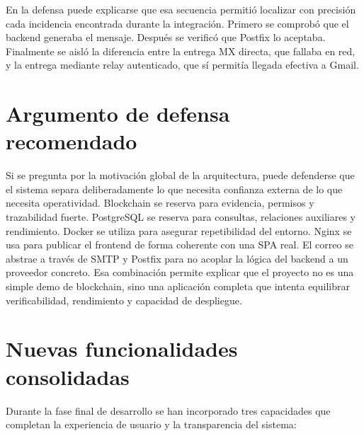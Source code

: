 \documentclass[11pt, a4paper]{article}
\begin{document}
En la defensa puede explicarse que esa secuencia permitió localizar con precisión cada incidencia encontrada durante la integración. Primero se comprobó que el backend generaba el mensaje. Después se verificó que Postfix lo aceptaba. Finalmente se aisló la diferencia entre la entrega MX directa, que fallaba en red, y la entrega mediante relay autenticado, que sí permitía llegada efectiva a Gmail.

\section{Argumento de defensa recomendado}

Si se pregunta por la motivación global de la arquitectura, puede defenderse que el sistema separa deliberadamente lo que necesita confianza externa de lo que necesita operatividad. Blockchain se reserva para evidencia, permisos y trazabilidad fuerte. PostgreSQL se reserva para consultas, relaciones auxiliares y rendimiento. Docker se utiliza para asegurar repetibilidad del entorno. Nginx se usa para publicar el frontend de forma coherente con una SPA real. El correo se abstrae a través de SMTP y Postfix para no acoplar la lógica del backend a un proveedor concreto. Esa combinación permite explicar que el proyecto no es una simple demo de blockchain, sino una aplicación completa que intenta equilibrar verificabilidad, rendimiento y capacidad de despliegue.

\section{Nuevas funcionalidades consolidadas}

Durante la fase final de desarrollo se han incorporado tres capacidades que completan la experiencia de usuario y la transparencia del sistema:
\end{document}
